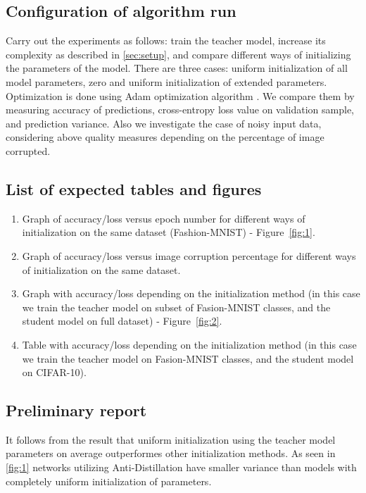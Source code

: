 \documentclass[80pt]{article}
\begin{document}
\subsection{Configuration of algorithm run}

Carry out the experiments as follows: train the teacher model, increase its complexity as described in \autoref{sec:setup}, and compare different ways of initializing the parameters of the model. There are three cases: uniform initialization of all model parameters, zero and uniform initialization of extended parameters. Optimization is done using Adam optimization algorithm \citep{adam}. We compare them by measuring accuracy of predictions, cross-entropy loss value on validation sample, and prediction variance. Also we investigate the case of noisy input data, considering above quality measures depending on the percentage of image corrupted.

\subsection{List of expected tables and figures}

\begin{enumerate}
    \item Graph of accuracy/loss versus epoch number for different ways of initialization on the same dataset (Fashion-MNIST) - Figure~\ref{fig:1}.
    \item Graph of accuracy/loss versus image corruption percentage for different ways of initialization on the same dataset.
    \item Graph with accuracy/loss depending on the initialization method (in this case we train the teacher model on subset of Fasion-MNIST classes, and the student model on full dataset) - Figure~\ref{fig:2}.
    \item Table with accuracy/loss depending on the initialization method (in this case we train the teacher model on Fasion-MNIST classes, and the student model on CIFAR-10).
\end{enumerate}

\subsection{Preliminary report}

It follows from the result that uniform initialization using the teacher model parameters on average outperformes other initialization methods. As seen in \ref{fig:1} networks utilizing Anti-Distillation have smaller variance than models with completely uniform initialization of parameters.
\end{document}
